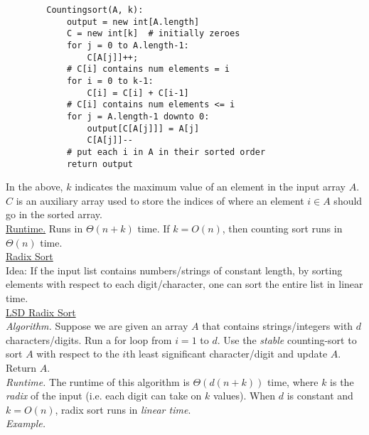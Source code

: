 \documentclass[12pt, fleqn]{general}
\begin{document}
\begin{multicols*}{2}
    \begin{framed}
    \begingroup
    \makeatletter
    \@totalleftmargin=-1.5cm
    \begin{verbatim}
        Countingsort(A, k):
            output = new int[A.length]
            C = new int[k]  # initially zeroes
            for j = 0 to A.length-1:
                C[A[j]]++;  
            # C[i] contains num elements = i
            for i = 0 to k-1:
                C[i] = C[i] + C[i-1]
            # C[i] contains num elements <= i
            for j = A.length-1 downto 0:
                output[C[A[j]]] = A[j]
                C[A[j]]--
            # put each i in A in their sorted order
            return output
    \end{verbatim}
    \makeatother
    \endgroup
    \end{framed}

    In the above, $k$ indicates the maximum value of an element in the input array $A$. $C$ is an auxiliary array used to store the indices of where an element $i \in A$ should go in the sorted array.\\

    \underline{Runtime.} Runs in $\Theta(n + k)$ time. If $k = O(n)$, then counting sort runs in $\Theta(n)$ time.\\


    {\large \underline{Radix Sort}}\\

    Idea: If the input list contains numbers/strings of constant length, by sorting elements with respect to each digit/character, one can sort the entire list in linear time.\\

    \underline{LSD Radix Sort}\\

    \emph{Algorithm.} Suppose we are given an array $A$ that contains strings/integers with $d$ characters/digits. Run a for loop from $i = 1$ to $d$. Use the \emph{stable} counting-sort to sort $A$ with respect to the $i$th least significant character/digit and update $A$. Return $A$.\\

    \emph{Runtime.} The runtime of this algorithm is $\Theta(d(n+k))$ time, where $k$ is the \emph{radix} of the input (i.e. each digit can take on $k$ values). When $d$ is constant and $k = O(n)$, radix sort runs in \emph{linear time}.\\

    \emph{Example.}


\end{multicols*}
\end{document}
